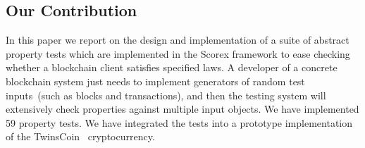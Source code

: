 
\subsection{Our Contribution}

In this paper we report on the design and implementation of a suite of abstract property tests which are implemented in the Scorex framework to ease checking whether a blockchain client satisfies specified laws. A developer of a concrete blockchain system just needs to implement generators of random test inputs~(such as blocks and transactions), and then the testing system will extensively check properties against multiple input objects. We have implemented 59 property tests. We have integrated the tests into a prototype implementation of the TwinsCoin~\cite{cryptoeprint:2017:232} cryptocurrency.  

